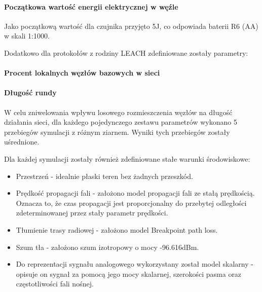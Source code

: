 \paragraph{Początkowa wartość energii elektrycznej w węźle}
Jako początkową wartość dla czujnika przyjęto 5J, co odpowiada baterii R6 (AA) w skali 1:1000.

Dodatkowo dla protokołów z rodziny LEACH zdefiniowane zostały parametry:
\paragraph{Procent lokalnych węzłów bazowych w sieci}
\paragraph{Długość rundy}

W celu zniwelowania wpływu losowego rozmieszczenia węzłów na długość działania sieci, dla każdego pojedynczego zestawu parametrów wykonano 5 przebiegów symulacji z różnym ziarnem. Wyniki tych przebiegów zostały uśrednione.

Dla każdej symulacji zostały również zdefiniowane stałe warunki środowiskowe:
\begin{itemize}
	\item Przestrzeń - idealnie płaski teren bez żadnych przeszkód.
	\item Prędkość propagacji fali - założono model propagacji fali ze stałą prędkością. Oznacza to, że czas propagacji jest proporcjonalny do przebytej odległości zdeterminowanej przez stały parametr prędkości.
	\item Tłumienie trasy radiowej - założono model Breakpoint path loss.
	\item Szum tła - założono szum izotropowy o mocy -96.616dBm.
	\item Do reprezentacji sygnału analogowego wykorzystany został model skalarny - opisuje on sygnał za pomocą jego mocy skalarnej, szerokości pasma oraz częstotliwości fali nośnej.
\end{itemize}